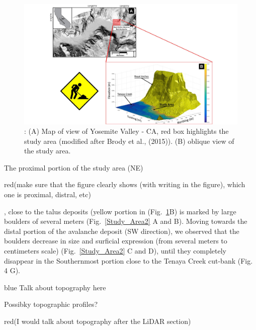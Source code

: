 \documentclass[5p]{elsarticle}
\newcommand{\COMON}{\begin{color}{blue}}
\newcommand{\COMOFF}{\end{color}}
\newcommand{\alon}{\begin{color}{red}}
\newcommand{\aloff}{\end{color}}
\begin{document}
									\begin{figure}[h]

	\includegraphics[width=\textwidth]{Figures/Study_Area.pdf}
		\caption{: (A) Map of view of Yosemite Valley - CA, red box highlights the study area (modified after Brody et al., (2015)). (B) oblique view of the study area.  \label{Study_Area}}


									\end{figure}

The proximal portion of the study area (NE) \alon(make sure that the figure clearly shows (with writing in the figure), which one is proximal, distral, etc)\aloff, close to the talus deposits (yellow portion in (Fig.~\ref{Study_Area}B) is marked by large boulders of several meters (Fig.~\ref{Study_Area2} A and B). Moving towards the distal portion of the avalanche deposit (SW direction), we observed that the boulders decrease in size and surficial expression (from several meters to centimeters scale) (Fig.~\ref{Study_Area2} C and D), until they completely disappear in the Southernmost portion close to the Tenaya Creek cut-bank (Fig. 4 G).

\COMON
Talk about topography here

Possibky topographic profiles?
\COMOFF

\alon (I would talk about topography after the LiDAR section) \aloff
\end{document}

